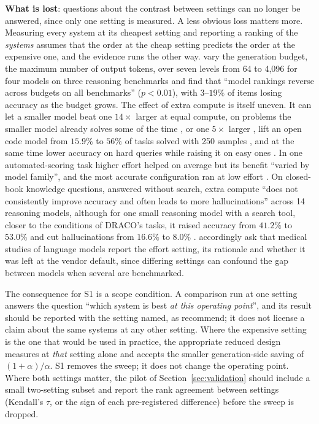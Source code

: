 \documentclass[11pt]{article}
\begin{document}
\textbf{What is lost}: questions about the contrast between settings can no longer be answered, since only one setting is measured. A less obvious loss matters more. Measuring every system at its cheapest setting and reporting a ranking of the \emph{systems} assumes that the order at the cheap setting predicts the order at the expensive one, and the evidence runs the other way. \citet{guedesdesouza2026budget} vary the generation budget, the maximum number of output tokens, over seven levels from 64 to 4,096 for four models on three reasoning benchmarks and find that ``model rankings reverse across budgets on all benchmarks'' ($p < 0.01$), with $3$--$19\%$ of items losing accuracy as the budget grows. The effect of extra compute is itself uneven. It can let a smaller model beat one $14\times$ larger at equal compute, on problems the smaller model already solves some of the time \citep{snell2024scaling}, or one $5\times$ larger \citep{wu2025inference}, lift an open code model from $15.9\%$ to $56\%$ of tasks solved with 250 samples \citep{brown2024monkeys}, and at the same time lower accuracy on hard queries while raising it on easy ones \citep{chen2024morecalls}. In one automated-scoring task higher effort helped on average but its benefit ``varied by model family'', and the most accurate configuration ran at low effort \citep{frohn2026effort}. On closed-book knowledge questions, answered without search, extra compute ``does not consistently improve accuracy and often leads to more hallucinations'' across 14 reasoning models, although for one small reasoning model with a search tool, closer to the conditions of DRACO's tasks, it raised accuracy from $41.2\%$ to $53.0\%$ and cut hallucinations from $16.6\%$ to $8.0\%$ \citep{zhao2026testtime}. \citet{kim2026kjr} accordingly ask that medical studies of language models report the effort setting, its rationale and whether it was left at the vendor default, since differing settings can confound the gap between models when several are benchmarked.

The consequence for S1 is a scope condition. A comparison run at one
setting answers the question ``which system is best \emph{at this operating point}'', and
its result should be reported with the setting named, as \citet{guedesdesouza2026budget}
recommend; it does not license a claim about the same systems at any other setting. Where
the expensive setting is the one that would be used in practice, the appropriate reduced
design measures at \emph{that} setting alone and accepts the smaller generation-side saving of $(1+\alpha)/\alpha$. S1 removes the sweep; it does not change the operating point. Where both settings matter, the pilot of
Section~\ref{sec:validation} should include a small two-setting subset and report the
rank agreement between settings (Kendall's $\tau$, or the sign of each pre-registered
difference) before the sweep is dropped.
\end{document}
